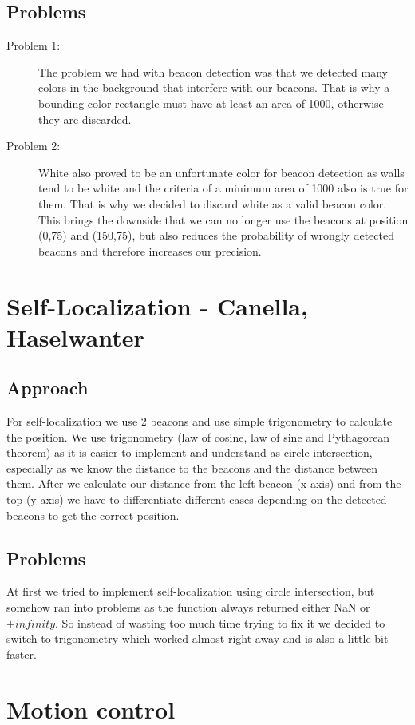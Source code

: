 \documentclass[703031]{iisreport}
\begin{document}
\subsection{Problems}

	\begin{description}
		\item [Problem 1:] The problem we had with beacon detection was that we detected many colors in the background that interfere with our beacons. That is why a bounding color rectangle must have at least an area of 1000, otherwise they are discarded.
		\item [Problem 2:] White also proved to be an unfortunate color for beacon detection as walls tend to be white and the criteria of a minimum area of 1000 also is true for them. That is why we decided to discard white as a valid beacon color. This brings the downside that we can no longer use the beacons at position (0,75) and (150,75), but also reduces the probability of wrongly detected beacons and therefore increases our precision.
	\end{description}


\section{Self-Localization - Canella, Haselwanter}
\subsection{Approach}
For self-localization we use 2 beacons and use simple trigonometry to calculate the position. We use trigonometry (law of cosine, law of sine and Pythagorean theorem) as it is easier to implement and understand as circle intersection, especially as we know the distance to the beacons and the distance between them.
After we calculate our distance from the left beacon (x-axis) and from the top (y-axis) we have to differentiate different cases depending on the detected beacons to get the correct position.
\subsection{Problems}
At first we tried to implement self-localization using circle intersection, but somehow ran into problems as the function always returned either NaN or $\pm infinity$. So instead of wasting too much time trying to fix it we decided to switch to trigonometry which worked almost right away and is also a little bit faster.
\section{Motion control}
\end{document}
